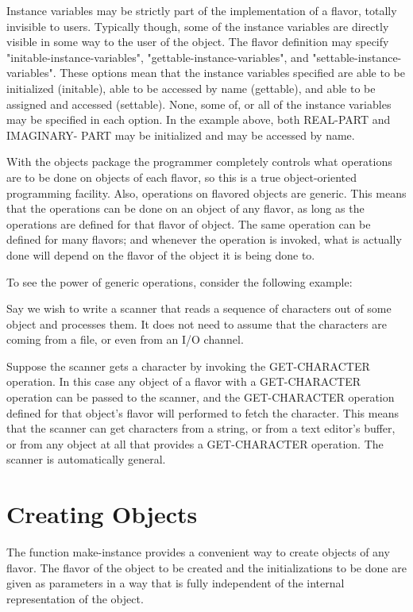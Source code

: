   Instance variables may be strictly part of the  implementation
of a flavor, totally invisible to users.  Typically though, some
of  the  instance  variables are directly visible in some way to
the user of the object. The flavor definition may specify
"initable-instance-variables", "gettable-instance-variables",
and "settable-instance-variables".  These options mean that  the
instance variables specified are able to be initialized
(initable), able to be accessed by name (gettable), and 
able to be assigned and accessed (settable). None, some of, 
or all of the instance variables may be specified in each  
option. In the example above, both REAL-PART and IMAGINARY-
PART may be initialized and may be accessed by name.

  With the objects package the  programmer  completely  controls
what  operations  are  to  be done on objects of each flavor, so
this is a  true  object-oriented  programming  facility.   Also,
operations on flavored objects are generic.  This means that the
operations  can  be  done on an object of any flavor, as long as
the operations are defined for that flavor of object.  The  same
operation  can  be  defined  for  many flavors; and whenever the
operation is invoked, what is actually done will depend  on  the
flavor of the object it is being done to.

  To see the power of generic operations, consider the following
example:

  Say  we    wish  to  write  a scanner that reads a sequence of
characters out of some object and processes them.  It  does  not
need  to  assume  that the characters are coming from a file, or
even from an I/O channel.

  Suppose the scanner gets a character by invoking the
GET-CHARACTER operation. In this case any object of a flavor with
a GET-CHARACTER operation can be passed to the scanner, and the
GET-CHARACTER operation defined for that object's flavor will
performed  to fetch the character. This means that the scanner can
get  characters from a string, or from a text editor's buffer, or
from  any object at all that provides a GET-CHARACTER operation.
The  scanner is automatically general.

\section{Creating Objects}

  The function make-instance provides a convenient way to create
objects of any flavor.  The flavor of the object to  be  created
and  the initializations to be done are given as parameters in a
way that is fully independent of the internal representation  of
the object.

